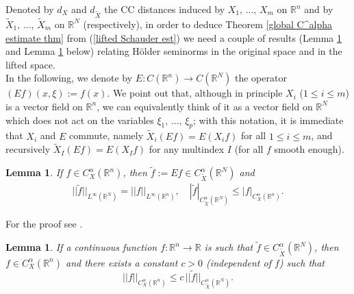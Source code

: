 \documentclass{article}
\newtheorem{lemma}[theorem]{Lemma}
\numberwithin{equation}{section}
\begin{document}
Denoted by $d_X$ and $d_{\widetilde{X}}$ the CC distances induced by $X_1, \, ..., \, X_m$ on $\mathbb{R}^n$ and by $\widetilde{X}_1, \, ..., \, \widetilde{X}_m$ on $\mathbb{R}^N$ (respectively), in order to deduce Theorem \ref{global C^alpha estimate thm} from (\ref{lifted Schauder est}) we need a couple of results (Lemma \ref{f C^alpha -> f tilde C^alpha} and Lemma \ref{f tilde C^alpha -> f C^alpha} below) relating Hölder seminorms in the original space and in the lifted space. \\In the following, we denote by $E:C(\mathbb{R}^n) \to C(\mathbb{R}^N)$ the  operator $(Ef)(x,\xi):=f(x)$. We point out that, although in principle $X_i$ ($1 \leq i \leq m$) is a vector field on $\mathbb{R}^n$, we can equivalently think of it as a vector field on $\mathbb{R}^N$ which does not act on the variables $\xi_1, \, ..., \, \xi_p$; with this notation, it is immediate that $X_i$ and $E$ commute, namely $\widetilde{X}_i(Ef)=E(X_i f)$ for all $1 \leq i \leq m$, and recursively $\widetilde{X}_I(Ef)=E(X_I f)$ for any multindex $I$ (for all $f$ smooth enough).

\vspace{2mm}

\begin{lemma} 
\label{f C^alpha -> f tilde C^alpha}
If $f \in C^{\alpha}_X(\mathbb{R}^n)$, then $\widetilde{f}:=Ef \in C^{\alpha}_{\widetilde{X}}(\mathbb{R}^N)$ and 
\begin{align*}||\widetilde{f}||_{L^{\infty}(\mathbb{R}^N)} = ||f||_{L^{\infty}(\mathbb{R}^n)}, \quad |\widetilde{f}|_{C^{\alpha}_{\widetilde{X}}(\mathbb{R}^N)} \leq |f|_{C^{\alpha}_X(\mathbb{R}^n)} \nonumber.
\end{align*}

\end{lemma}

\vspace{2mm}

For the proof see \cite[Proposition 10.39]{librone}.

\vspace{2mm}

\begin{lemma}
\label{f tilde C^alpha -> f C^alpha}
    If a continuous function $f : \mathbb{R}^n \to \mathbb{R}$ is such that $\widetilde{f} \in C^{\alpha}_{\widetilde{X}}(\mathbb{R}^N)$, then $f \in C^{\alpha}_X(\mathbb{R}^n)$ and there exists a constant $c>0$ (independent of $f$) such that 
    \begin{equation*}
    ||f||_{C^{\alpha}_X(\mathbb{R}^n)} \leq c \, ||\widetilde{f}||_{C^{\alpha}_{\widetilde{X}}(\mathbb{R}^N)}.
    \end{equation*}
\end{lemma}
\end{document}
